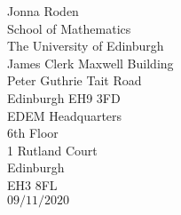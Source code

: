 \documentclass[11pt, letterpaper]{article}
\begin{document}
	\thispagestyle{empty}
	
\RaggedLeft
Jonna Roden\\
School of Mathematics \\
The University of Edinburgh  \\
James Clerk Maxwell Building\\
Peter Guthrie Tait Road\\
{Edinburgh EH9 3FD}\\

	
\RaggedRight
EDEM Headquarters\\
6th Floor\\
1 Rutland Court\\
Edinburgh\\
EH3 8FL	\\	
\vspace{0.6 cm}
$09/11/2020$
\end{document}
